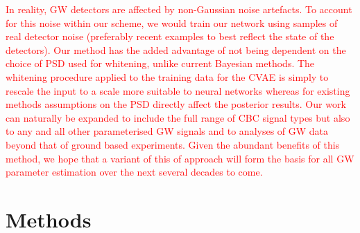 %
%
\textcolor{red}{
In reality, \ac{GW} detectors are affected by non-Gaussian noise artefacts. To
account for this noise within our scheme, we would train our network using
samples of real detector noise (preferably recent examples to best reflect the
state of the detectors). Our method has the added advantage of not being
dependent on the choice of \ac{PSD} used for whitening, unlike current Bayesian
methods. The whitening procedure applied to the training data for the \ac{CVAE}
is simply to rescale the input to a scale more suitable to neural networks
whereas for existing methods assumptions on the \ac{PSD} directly affect the
posterior results. Our work can naturally be expanded to include the full range
of \ac{CBC} signal types but also to any and all other parameterised \ac{GW}
signals and to analyses of \ac{GW} data beyond that of ground based
experiments. Given the abundant benefits of this method, we hope that a variant
of this of approach will form the basis for all \ac{GW} parameter estimation
over the next several decades to come.}
%
%

%
%



%
%
\section{Methods}\label{sec:methods}
%

